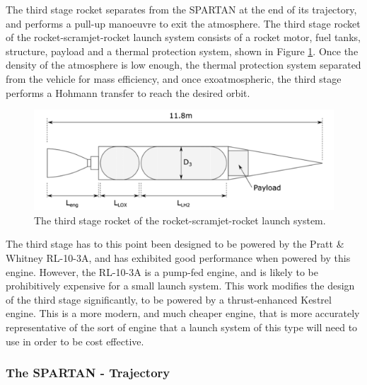 The third stage rocket separates from the SPARTAN at the end of its trajectory, and performs a pull-up manoeuvre to exit the atmosphere. The third stage rocket of the rocket-scramjet-rocket launch system consists of a rocket motor, fuel tanks, structure, payload and a thermal protection system\cite{Preller2017b}, shown in Figure \ref{fig:ThirdStage}. Once the density of the atmosphere is low enough, the thermal protection system separated from the vehicle for mass efficiency, and once exoatmospheric, the third stage performs a Hohmann transfer to reach the desired orbit. 
\begin{figure}[ht]
	\centering
	\includegraphics[width=0.7\linewidth]{figures/2_literature-review/ThirdStage}
	\caption{The third stage rocket of the rocket-scramjet-rocket launch system\cite{Preller2017b}.}
	\label{fig:ThirdStage}
\end{figure}
The third stage has to this point been designed to be powered by the Pratt \& Whitney RL-10-3A\cite{Preller2017b}, and has exhibited good performance when powered by this engine. However, the RL-10-3A is a pump-fed engine, and is likely to be prohibitively expensive for a small launch system. This work modifies the design of the third stage significantly, to be powered by a thrust-enhanced Kestrel engine. This is a more modern, and much cheaper engine, that is more accurately representative of the sort of engine that a launch system of this type will need to use in order to be cost effective. 
 

\subsubsection{The SPARTAN - Trajectory}


